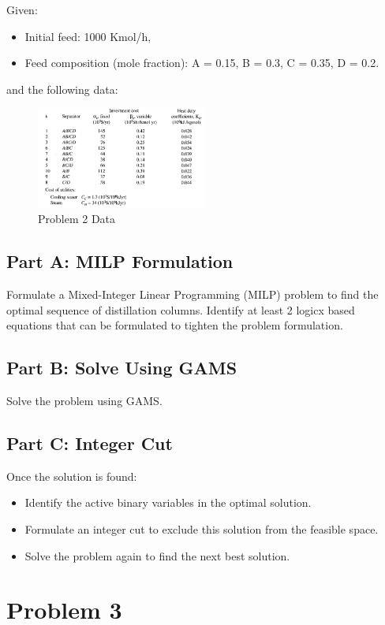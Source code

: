 \documentclass[11pt]{article}
\begin{document}
Given:
\begin{itemize}
  \item Initial feed: 1000 Kmol/h,
  \item Feed composition (mole fraction): A = 0.15, B = 0.3, C = 0.35, D = 0.2.
\end{itemize}
and the following data:
\begin{figure}[htbp]
  \centerline{\includegraphics[width=0.50\textwidth]{images/prob2_table.png}}
  \caption{Problem 2 Data}
  \label{fig:prob2_table}
\end{figure}

\subsection{Part A: MILP Formulation}
Formulate a Mixed-Integer Linear Programming (MILP) problem to find the optimal sequence of distillation columns. 
Identify at least 2 logicx based equations that can be formulated to tighten the problem formulation.


\subsection{Part B: Solve Using GAMS}
Solve the problem using GAMS.

\subsection{Part C: Integer Cut}
Once the solution is found:
\begin{itemize}
  \item Identify the active binary variables in the optimal solution.
  \item Formulate an integer cut to exclude this solution from the feasible space.
  \item Solve the problem again to find the next best solution.
\end{itemize}

\clearpage
\section{Problem 3}
\label{prob3}
\end{document}

